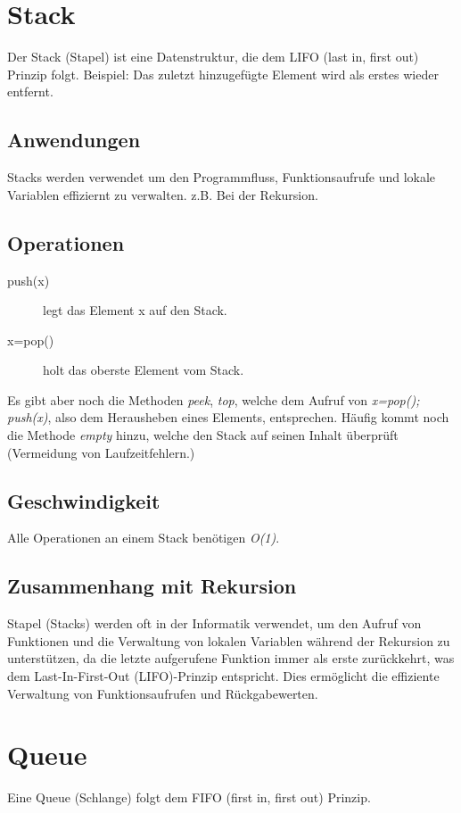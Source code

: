 \documentclass{book}
\begin{document}
\section{Stack}
Der Stack (Stapel) ist eine Datenstruktur, die dem LIFO (last in, first out) Prinzip folgt.
Beispiel:
Das zuletzt hinzugefügte Element wird als erstes wieder entfernt.

\subsection{Anwendungen}
Stacks werden verwendet um den Programmfluss, Funktionsaufrufe und lokale Variablen effiziernt zu verwalten. z.B. Bei der Rekursion.

\subsection{Operationen}
\begin{description}
	\item[push(x)] legt das Element x auf den Stack.
	\item[x=pop()] holt das oberste Element vom Stack.  
\end{description}
Es gibt aber noch die Methoden \textit{peek}, \textit{top}, welche dem Aufruf von \textit{x=pop(); push(x)}, also dem Herausheben eines Elements, entsprechen.
Häufig kommt noch die Methode \textit{empty} hinzu, welche den Stack auf seinen Inhalt überprüft (Vermeidung von Laufzeitfehlern.)

\subsection{Geschwindigkeit}
Alle Operationen an einem Stack benötigen \textit{O(1)}.

\subsection{Zusammenhang mit Rekursion}
Stapel (Stacks) werden oft in der Informatik verwendet, um den Aufruf von Funktionen und die Verwaltung von lokalen Variablen während der Rekursion zu unterstützen, da die letzte aufgerufene Funktion immer als erste zurückkehrt, 
was dem Last-In-First-Out (LIFO)-Prinzip entspricht. Dies ermöglicht die effiziente Verwaltung von Funktionsaufrufen und Rückgabewerten.

\section{Queue}
Eine Queue (Schlange) folgt dem FIFO (first in, first out) Prinzip.
\end{document}
